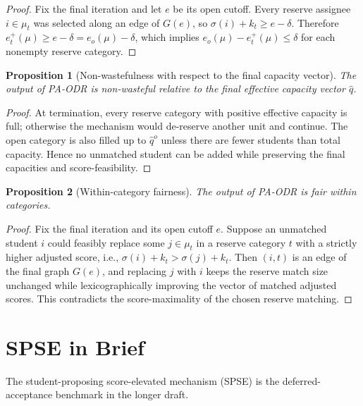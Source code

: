 \documentclass[10pt]{article}
\newtheorem{proposition}{Proposition}
\begin{document}
\begin{proof}
Fix the final iteration and let $e$ be its open cutoff. Every reserve assignee $i\in\mu_t$ was selected along an edge of $G(e)$, so $\sigma(i)+k_t\ge e-\delta$. Therefore $e_t^+(\mu)\ge e-\delta=e_o(\mu)-\delta$, which implies $e_o(\mu)-e_t^+(\mu)\le \delta$ for each nonempty reserve category.
\end{proof}

\begin{proposition}[Non-wastefulness with respect to the final capacity vector]
\label{prop:paodr-nonwaste-short}
The output of PA-ODR is non-wasteful relative to the final effective capacity vector $\hat q$.
\end{proposition}

\begin{proof}
At termination, every reserve category with positive effective capacity is full; otherwise the mechanism would de-reserve another unit and continue. The open category is also filled up to $\hat q^o$ unless there are fewer students than total capacity. Hence no unmatched student can be added while preserving the final capacities and score-feasibility.
\end{proof}

\begin{proposition}[Within-category fairness]
\label{prop:paodr-within-short}
The output of PA-ODR is fair within categories.
\end{proposition}

\begin{proof}
Fix the final iteration and its open cutoff $e$. Suppose an unmatched student $i$ could feasibly replace some $j\in\mu_t$ in a reserve category $t$ with a strictly higher adjusted score, i.e., $\sigma(i)+k_t>\sigma(j)+k_t$. Then $(i,t)$ is an edge of the final graph $G(e)$, and replacing $j$ with $i$ keeps the reserve match size unchanged while lexicographically improving the vector of matched adjusted scores. This contradicts the score-maximality of the chosen reserve matching.
\end{proof}

\section{SPSE in Brief}

The student-proposing score-elevated mechanism (SPSE) is the deferred-acceptance benchmark in the longer draft.
\end{document}
